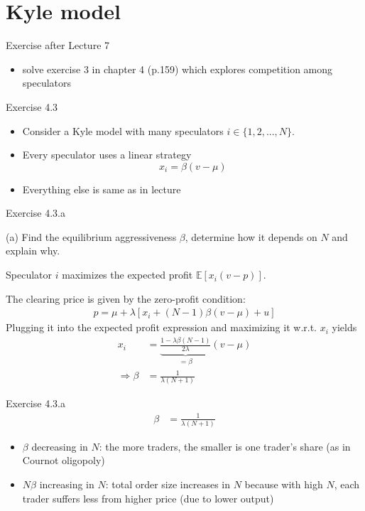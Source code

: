 \documentclass[english,10pt
,handout
,aspectratio=169
]{beamer}
\begin{document}
\section{Kyle model}

\begin{frame}{Exercise after Lecture 7}
	\begin{itemize}
		\item solve exercise 3 in chapter 4 (p.159) which explores competition among speculators
	\end{itemize}
\end{frame}


\begin{frame}{Exercise 4.3}
	\begin{itemize}
		\item Consider a Kyle model with many speculators $i \in \{1,2,...,N\}$.
		\item Every speculator uses a linear strategy
		$$ x_i = \beta (v-\mu) $$
		\item Everything else is same as in lecture
	\end{itemize}
\end{frame}


\begin{frame}{Exercise 4.3.a}
	\begin{exampleblock}{}
		(a) Find the equilibrium aggressiveness $\beta$, determine how it depends on $N$ and explain why.
	\end{exampleblock}
	
	\pause
	
	Speculator $i$ maximizes the expected profit $\mathbb{E} [x_i (v-p)]$.
	
	The clearing price is given by the zero-profit condition:
	\begin{align*}
		p = \mu + \lambda [x_i + (N-1) \beta (v-\mu) + u]
	\end{align*}
	Plugging it into the expected profit expression and maximizing it w.r.t. $x_i$ yields
	\begin{align*}
		x_i &= \underbrace{\frac{1 - \lambda \beta (N-1)}{2 \lambda}}_{=\beta} (v-\mu)
		\\
		\Rightarrow
		\beta &= \frac{1}{\lambda (N+1)}
	\end{align*}
\end{frame}


\begin{frame}{Exercise 4.3.a}
	\begin{align*}
	\beta &= \frac{1}{\lambda (N+1)}
	\end{align*}
	
	\begin{itemize}
		\item $\beta$ decreasing in $N$: the more traders, the smaller is one trader's share (as in Cournot oligopoly)
		\item $N \beta$ increasing in $N$: total order size increases in $N$ because with high $N$, each trader suffers less from higher price (due to lower output)
	\end{itemize}
\end{frame}
\end{document}
